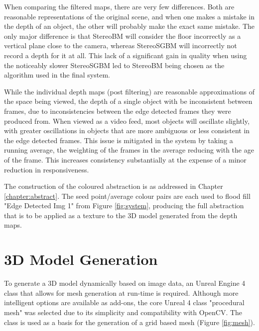 When comparing the filtered maps, there are very few differences. Both are reasonable representations of the original scene, and when one makes a mistake in the depth of an object, the other will probably make the exact same mistake. The only major difference is that StereoBM will consider the floor incorrectly as a vertical plane close to the camera, whereas StereoSGBM will incorrectly not record a depth for it at all. This lack of a significant gain in quality when using the noticeably slower StereoSGBM led to StereoBM being chosen as the algorithm used in the final system.

While the individual depth maps (post filtering) are reasonable approximations of the space being viewed, the depth of a single object with be inconsistent between frames, due to inconsistencies between the edge detected frames they were produced from. When viewed as a video feed, most objects will oscillate slightly, with greater oscillations in objects that are more ambiguous or less consistent in the edge detected frames. This issue is mitigated in the system by taking a running average, the weighting of the frames in the average reducing with the age of the frame. This increases consistency substantially at the expense of a minor reduction in responsiveness.

The construction of the coloured abstraction is as addressed in Chapter \ref{chapter:abstract}. The seed point/average colour pairs are each used to flood fill "Edge Detected Img 1" from Figure \ref{fig:system}, producing the full abstraction that is to be applied as a texture to the 3D model generated from the depth maps.

\section{3D Model Generation}

To generate a 3D model dynamically based on image data, an Unreal Engine 4 class that allows for mesh generation at run-time is required. Although more intelligent options are available as add-ons, the core Unreal 4 class "procedural mesh" was selected due to its simplicity and compatibility with OpenCV. The class is used as a basis for the generation of a grid based mesh (Figure \ref{fig:mesh}).

